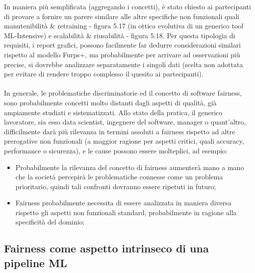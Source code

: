     In maniera più semplificata (aggregando i concetti), è stato chiesto ai partecipanti di provare a fornire un parere similare alle altre specifiche non funzionali quali manutenibilità \& retraining - figura 5.17 (in ottica evolutiva di un generico tool ML-Intensive) e scalabilità \& riusabilità - figura 5.18. Per questa tipologia di requisiti, i report grafici, possono facilmente far dedurre considerazioni similari rispetto al modello Furps+, ma probabilmente per arrivare ad osservazioni più precise, si dovrebbe analizzare separatamente i singoli dati (scelta non adottata per evitare di rendere troppo complesso il quesito ai partecipanti).\\\\
    
    In generale, le problematiche discriminatorie ed il concetto di software fairness, sono probabilmente concetti molto distanti dagli aspetti di qualità, già ampiamente studiati e sistematizzati. Allo stato della pratica, il generico lavoratore, sia esso data scientist, ingegnere del software, manager o quant'altro, difficilmente darà  più rilevanza in termini assoluti a fairness rispetto ad altre prerogative non funzionali (a maggior ragione per aspetti critici, quali accuracy, performance o sicurezza), e le cause possono essere molteplici, ad esempio:
    
    \begin{itemize}
        \item Probabilmente la rilevanza del concetto di fairness aumenterà mano a mano che la società percepirà le problematiche connesse come un problema prioritario, quindi tali confronti dovranno essere ripetuti in futuro;
        \item Fairness probabilmente necessita di essere analizzata in maniera diversa rispetto gli aspetti non funzionali standard, probabilmente in ragione alla specificità del dominio;

    \end{itemize}
    
    \subsection{Fairness come aspetto intrinseco di una pipeline ML}

    	\begin{center}
    	\hspace*{-5mm}%
    \end{center}
    
